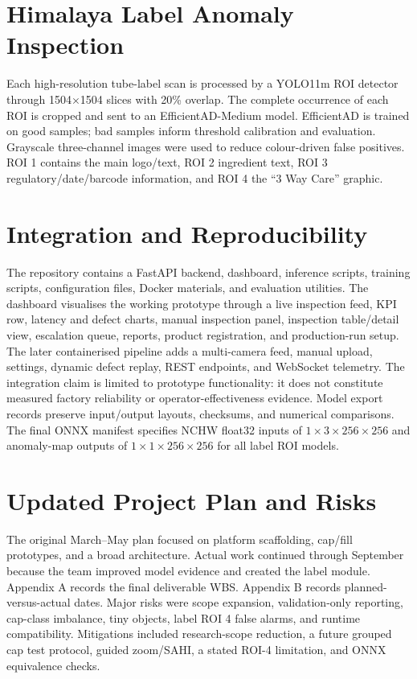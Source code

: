 \documentclass[12pt,a4paper]{report}
\begin{document}
\section{Himalaya Label Anomaly Inspection}
Each high-resolution tube-label scan is processed by a YOLO11m ROI detector through 1504$\times$1504 slices with 20\% overlap. The complete occurrence of each ROI is cropped and sent to an EfficientAD-Medium model. EfficientAD is trained on good samples; bad samples inform threshold calibration and evaluation. Grayscale three-channel images were used to reduce colour-driven false positives. ROI 1 contains the main logo/text, ROI 2 ingredient text, ROI 3 regulatory/date/barcode information, and ROI 4 the ``3 Way Care'' graphic.

\section{Integration and Reproducibility}
The repository contains a FastAPI backend, dashboard, inference scripts, training scripts, configuration files, Docker materials, and evaluation utilities. The dashboard visualises the working prototype through a live inspection feed, KPI row, latency and defect charts, manual inspection panel, inspection table/detail view, escalation queue, reports, product registration, and production-run setup. The later containerised pipeline adds a multi-camera feed, manual upload, settings, dynamic defect replay, REST endpoints, and WebSocket telemetry. The integration claim is limited to prototype functionality: it does not constitute measured factory reliability or operator-effectiveness evidence. Model export records preserve input/output layouts, checksums, and numerical comparisons. The final ONNX manifest specifies NCHW float32 inputs of $1\times3\times256\times256$ and anomaly-map outputs of $1\times1\times256\times256$ for all label ROI models.

\section{Updated Project Plan and Risks}
The original March--May plan focused on platform scaffolding, cap/fill prototypes, and a broad architecture. Actual work continued through September because the team improved model evidence and created the label module. Appendix A records the final deliverable WBS. Appendix B records planned-versus-actual dates. Major risks were scope expansion, validation-only reporting, cap-class imbalance, tiny objects, label ROI 4 false alarms, and runtime compatibility. Mitigations included research-scope reduction, a future grouped cap test protocol, guided zoom/SAHI, a stated ROI-4 limitation, and ONNX equivalence checks.
\end{document}
